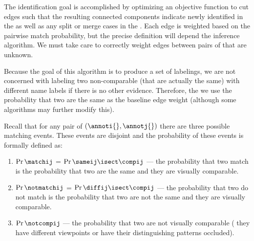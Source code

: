             \edgeexample{}

            The identification goal is accomplished by optimizing an objective
              function to cut edges such that the resulting connected components
              indicate newly identified \names{} in the \uset{} as well as any
              split or merge cases in the \lset{}.
            Each edge is weighted based on the pairwise match probability, but
              the precise definition will depend the inference algorithm.
            We must take care to correctly weight edges between pairs of
              \annots{} that are unknown.

            Because the goal of this algorithm is to produce a set of
              labelings, we are not concerned with labeling two non-comparable
              \annots{} (that are actually the same) with different name labels
              if there is no other evidence.
            Therefore, the we use the probability that two \annots{} are the
              same as the baseline edge weight (although some algorithms may
              further modify this).

            Recall that for any pair of \annots{} $(\annoti{}, \annotj{})$
              there are three possible matching events.
            These events are disjoint and the probability of these events is
              formally defined as:
            \begin{enumerate}
                \item $\Pr{\matchij}$ = $\Pr{\sameij \isect \compij}$ --- the
                    probability that two \annot{} match is the probability
                      that two \annots{} are the same and they are visually
                      comparable.

                \item $\Pr{\notmatchij}$ = $\Pr{\diffij \isect \compij}$ ---
                    the probability that two \annots{} do not match is the
                      probability that two \annots{} are not the same and they
                      are visually comparable.

                \item $\Pr{\notcompij}$ --- the probability that two \annots{}
                    are not visually comparable (\eg{} they have different
                      viewpoints or have their distinguishing patterns
                      occluded).
            \end{enumerate}

